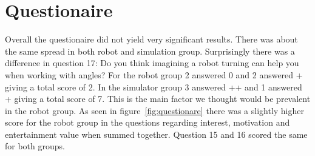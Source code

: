 \section{Questionaire}
Overall the questionaire did not yield very significant results. There was about the same spread in both robot and simulation group. Surprisingly there was a difference in question 17: Do you think imagining a robot turning can help you when working with angles? For the robot group 2 answered 0 and 2 answered + giving a total score of 2. In the simulator group 3 answered ++ and 1 answered + giving a total score of 7. This is the main factor we thought would be prevalent in the robot group. As seen in figure~\ref{fig:questionare} there was a slightly higher score for the robot group in the questions regarding interest, motivation and entertainment value when summed together. Question 15 and 16 scored the same for both groups.

